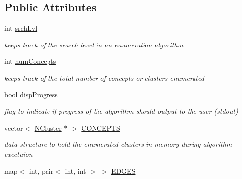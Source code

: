 \subsection*{Public Attributes}
\begin{DoxyCompactItemize}
\item 
\hypertarget{class_lattice_algos_a7061dd2e2590fa24e0dfb16f28509dce}{
int \hyperlink{class_lattice_algos_a7061dd2e2590fa24e0dfb16f28509dce}{srchLvl}}
\label{class_lattice_algos_a7061dd2e2590fa24e0dfb16f28509dce}

\begin{DoxyCompactList}\small\item\em keeps track of the search level in an enumeration algorithm \item\end{DoxyCompactList}\item 
\hypertarget{class_lattice_algos_a8a6e4d766e7f93a288e015e93b3183a0}{
int \hyperlink{class_lattice_algos_a8a6e4d766e7f93a288e015e93b3183a0}{numConcepts}}
\label{class_lattice_algos_a8a6e4d766e7f93a288e015e93b3183a0}

\begin{DoxyCompactList}\small\item\em keeps track of the total number of concepts or clusters enumerated \item\end{DoxyCompactList}\item 
\hypertarget{class_lattice_algos_a7c599d38a3a66b926d7345153ca2e93c}{
bool \hyperlink{class_lattice_algos_a7c599d38a3a66b926d7345153ca2e93c}{dispProgress}}
\label{class_lattice_algos_a7c599d38a3a66b926d7345153ca2e93c}

\begin{DoxyCompactList}\small\item\em flag to indicate if progress of the algorithm should output to the user (stdout) \item\end{DoxyCompactList}\item 
\hypertarget{class_lattice_algos_a006fbb44cdb89ab949bc9f47ed20a6d3}{
vector$<$ \hyperlink{class_n_cluster}{NCluster} $\ast$ $>$ \hyperlink{class_lattice_algos_a006fbb44cdb89ab949bc9f47ed20a6d3}{CONCEPTS}}
\label{class_lattice_algos_a006fbb44cdb89ab949bc9f47ed20a6d3}

\begin{DoxyCompactList}\small\item\em data structure to hold the enumerated clusters in memory during algorithm exectuion \item\end{DoxyCompactList}\item 
\hypertarget{class_lattice_algos_af46b9da065dcdb115038a801a5125208}{
map$<$ int, pair$<$ int, int $>$ $>$ \hyperlink{class_lattice_algos_af46b9da065dcdb115038a801a5125208}{EDGES}}
\label{class_lattice_algos_af46b9da065dcdb115038a801a5125208}


\end{DoxyCompactItemize}
